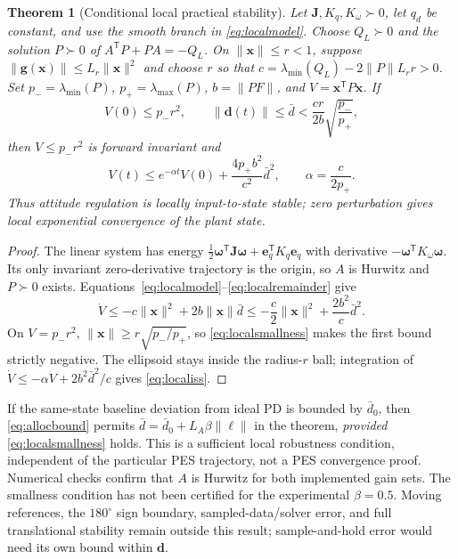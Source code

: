 \documentclass[letterpaper, 10 pt, conference]{ieeeconf}
\newcommand{\T}{^{\mathsf T}}
\newtheorem{theorem}{Theorem}
\begin{document}
\begin{theorem}[Conditional local practical stability]
\label{thm:local}
Let $\bm J,K_q,K_\omega\succ0$, let $q_d$ be constant, and use the smooth
branch in \eqref{eq:localmodel}. Choose $Q_L\succ0$ and the solution
$P\succ0$ of $A\T P+PA=-Q_L$. On $\|\bm x\|\le r<1$, suppose
$\|\bm g(\bm x)\|\le L_r\|\bm x\|^2$ and choose $r$ so that
$c=\lambda_{\min}(Q_L)-2\|P\|L_r r>0$.
Set $p_- =\lambda_{\min}(P)$, $p_+=\lambda_{\max}(P)$,
$b=\|PF\|$, and $V=\bm x\T P\bm x$. If
\begin{equation}
 V(0)\le p_-r^2,\qquad
 \|\bm d(t)\|\le\bar d<\frac{cr}{2b}\sqrt{\frac{p_-}{p_+}},
 \label{eq:localsmallness}
\end{equation}
then $V\le p_-r^2$ is forward invariant and
\begin{equation}
 V(t)\le e^{-\alpha t}V(0)+\frac{4p_+b^2}{c^2}\bar d^2,
 \qquad \alpha=\frac{c}{2p_+}.
 \label{eq:localiss}
\end{equation}
Thus attitude regulation is locally input-to-state stable; zero
perturbation gives local exponential convergence of the plant state.
\end{theorem}
\begin{proof}
The linear system has energy
$\frac12\bm\omega\T\bm J\bm\omega+\bm e_q\T K_q\bm e_q$ with derivative
$-\bm\omega\T K_\omega\bm\omega$. Its only invariant zero-derivative
trajectory is the origin, so $A$ is Hurwitz and $P\succ0$ exists.
Equations~\eqref{eq:localmodel}--\eqref{eq:localremainder} give
\[
 \dot V\le-c\|\bm x\|^2+2b\|\bm x\|\bar d
 \le-\frac c2\|\bm x\|^2+\frac{2b^2}{c}\bar d^2.
\]
On $V=p_-r^2$, $\|\bm x\|\ge r\sqrt{p_-/p_+}$, so
\eqref{eq:localsmallness} makes the first bound strictly negative.
The ellipsoid stays inside the radius-$r$ ball; integration of
$\dot V\le-\alpha V+2b^2\bar d^2/c$ gives \eqref{eq:localiss}.
\end{proof}

If the same-state baseline deviation from ideal PD is bounded by $\bar d_0$,
then \eqref{eq:allocbound} permits
$\bar d=\bar d_0+L_A\beta\|\bm\ell\|$ in the theorem, \emph{provided}
\eqref{eq:localsmallness} holds. This is a sufficient local robustness
condition, independent of the particular PES trajectory, not a PES
convergence proof. Numerical checks confirm that $A$ is Hurwitz for both
implemented gain sets. The smallness condition has not been certified
for the experimental $\beta=0.5$. Moving references, the $180^\circ$
sign boundary, sampled-data/solver error, and full translational stability
remain outside this result; sample-and-hold error would need its own
bound within $\bm d$.
\end{document}

